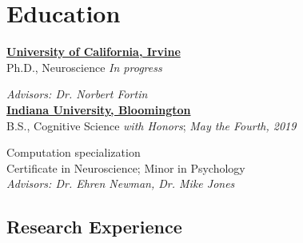 \documentclass[10pt]{cooperCV2}
\begin{document}

\section{Education} 

  

\href{http://www.iu.edu/}{\textbf{University of California, Irvine}} \\
 Ph.D., Neuroscience \hfill \textit{In progress}



 \textit{Advisors: Dr. Norbert Fortin}\\ 

  

\href{http://www.iu.edu/}{\textbf{Indiana University, Bloomington}} \\
 B.S., Cognitive Science \textit{with Honors}; \hfill \textit{May the Fourth, 2019}

 Computation specialization \\ 
 Certificate in Neuroscience; Minor in Psychology\\  
 \textit{Advisors: Dr. Ehren Newman, Dr. Mike Jones}\\ 








%	






\subsection{Research Experience}
\needspace{4em}
\myRule{\columnwidth}{1pt}
\end{document}
